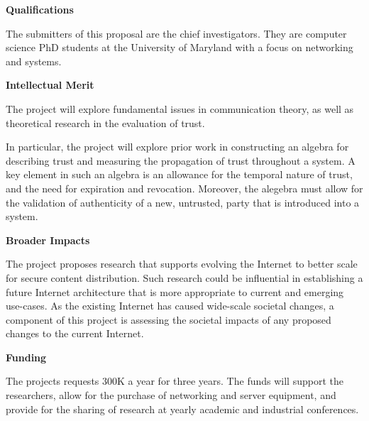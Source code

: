 \documentclass{proposalnsf}
\begin{document}
\noindent
{\bf Qualifications}

The submitters of this proposal are the chief investigators.  They are computer
science PhD students at the University of Maryland with a focus on networking
and systems.

\noindent
{\bf Intellectual Merit}

The project will explore fundamental issues in communication theory, as well as
theoretical research in the evaluation of trust.

In particular, the project will explore prior work in constructing an algebra
for describing trust and measuring the propagation of trust throughout a
system.  A key element in such an algebra is an allowance for the temporal
nature of trust, and the need for expiration and revocation.  Moreover, the
alegebra must allow for the validation of authenticity of a new, untrusted, party that is introduced into a system.

\noindent
{\bf Broader Impacts}

The project proposes research that supports evolving the Internet to better
scale for secure content distribution.  Such research could be influential in
establishing a future Internet architecture that is more appropriate to current
and emerging use-cases.  As the existing Internet has caused wide-scale
societal changes, a component of this project is assessing the societal impacts
of any proposed changes to the current Internet.

\noindent
{\bf Funding}

The projects requests 300K a year for three years.  The funds will support the
researchers, allow for the purchase of networking and server equipment, and
provide for the sharing of research at yearly academic and industrial
conferences.
\end{document}
